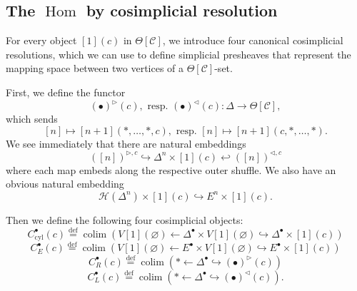 \documentclass[a4paper]{article}
\numberwithin{equation}{subsection}
\theoremstyle{plain}   %
\theoremstyle{definition}
\theoremstyle{remark}
\theoremstyle{plain}
\DeclareMathOperator{\colim}{colim}
\DeclareMathOperator{\Hom}{Hom}
\providecommand{\C}{}
\renewcommand{\C}{\ensuremath{\mathcal{C}}}
\newcommand{\defeq}{\overset{\mathrm{def}}=}
\begin{document}
\subsection{The \(\Hom\) by cosimplicial resolution}
For every object \([1](c)\) in \(\Theta[\C]\), we introduce four canonical cosimplicial resolutions, which we can use to define simplicial presheaves that represent the mapping space between two vertices of a \(\Theta[\C]\)-set.

First, we define the functor
\[(\bullet)^{\triangleright}(c),\text{ resp. }(\bullet)^{\triangleleft}(c): \Delta \to \Theta[\C],\]
which sends
\[[n]\mapsto [n+1](\ast,\dots,\ast,c), \text{ resp. } [n]\mapsto [n+1](c,\ast,\dots,\ast).\]
We see immediately that there are natural embeddings
\[([n])^{\triangleright,c} \hookrightarrow \Delta^n \times [1](c)  \hookleftarrow ([n])^{\triangleleft,c}\]
where each map embeds along the respective outer shuffle. We also have an obvious natural embedding
\[\mathscr{H}(\Delta^n)\times [1](c) \hookrightarrow E^n\times [1](c).\]

Then we define the following four cosimplicial objects:
\[C^\bullet_{\mathrm{cyl}}(c)\defeq \colim \left( V[1](\varnothing) \leftarrow \Delta^\bullet \times V[1](\varnothing) \hookrightarrow \Delta^\bullet\times [1](c)\right)\]
\[C^\bullet_{E}(c)\defeq \colim \left( V[1](\varnothing) \leftarrow E^\bullet \times V[1](\varnothing) \hookrightarrow E^\bullet\times [1](c)\right)\]
\[C^\bullet_{R}(c)\defeq \colim \left( \ast \leftarrow \Delta^\bullet \hookrightarrow (\bullet)^\triangleright(c)\right)\]
\[C^\bullet_{L}(c)\defeq \colim \left( \ast \leftarrow \Delta^\bullet \hookrightarrow (\bullet)^\triangleleft(c)\right).\]
\end{document}
